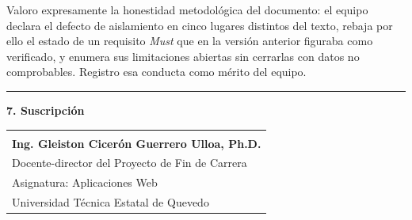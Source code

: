 \documentclass[11pt,letterpaper]{article}
\begin{document}
Valoro expresamente la honestidad metodológica del documento: el equipo declara el defecto de aislamiento en cinco lugares distintos del texto, rebaja por ello el estado de un requisito \emph{Must} que en la versión anterior figuraba como verificado, y enumera sus limitaciones abiertas sin cerrarlas con datos no comprobables. Registro esa conducta como mérito del equipo.

\vspace{6pt}

\noindent\rule{\textwidth}{0.4pt}

\vspace{4pt}

\noindent\textbf{7. Suscripción}

\vspace{18pt}

\noindent\begin{tabular}{@{}p{10.5cm}@{}}
	\hrulefill \\[3pt]
	\textbf{Ing. Gleiston Cicerón Guerrero Ulloa, Ph.D.} \\
	Docente-director del Proyecto de Fin de Carrera \\
	Asignatura: Aplicaciones Web \\
	Universidad Técnica Estatal de Quevedo \\
\end{tabular}

\vspace{8pt}

\end{document}
